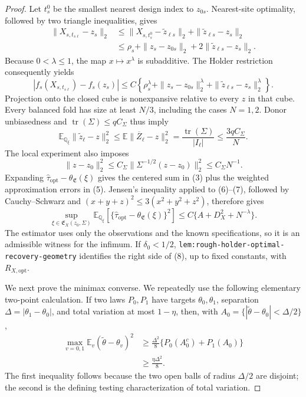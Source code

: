 \documentclass{article}
\begin{document}
\begin{proof}
Let \(t_s^0\) be the smallest nearest design index to \(z_{0s}\).  Nearest-site optimality, followed by two triangle inequalities, gives
\[
\begin{aligned}
 \|X_{s,t_{s\ell}}-z_s\|_2
 &\le \|X_{s,t_s^0}-\widetilde z_{\ell s}\|_2
       +\|\widetilde z_{\ell s}-z_s\|_2\\
 &\le \rho_s+\|z_s-z_{0s}\|_2
       +2\|\widetilde z_{\ell s}-z_s\|_2.
\end{aligned}                                               \tag{4}
\]
Because \(0<\lambda\le1\), the map \(x\mapsto x^\lambda\) is subadditive.  The Holder restriction consequently yields
\[
 |f_s(X_{s,t_{s\ell}})-f_s(z_s)|
 \le C\left\{\rho_s^\lambda+
 \|z_s-z_{0s}\|_2^\lambda+
 \|\widetilde z_{\ell s}-z_s\|_2^\lambda\right\}.        \tag{5}
\]
Projection onto the closed cube is nonexpansive relative to every \(z\) in that cube.  Every balanced fold has size at least \(N/3\), including the cases \(N=1,2\).  Donor unbiasedness and \(\operatorname{tr}(\Sigma)\le qC_\Sigma\) thus imply
\[
 \mathbb E_{\mathbb Q_\xi}\|\widetilde z_\ell-z\|_2^2
 \le\mathbb E\|\overline Z_\ell-z\|_2^2
 =\frac{\operatorname{tr}(\Sigma)}{|I_\ell|}
 \le\frac{3qC_\Sigma}{N}.                                  \tag{6}
\]
The local experiment also imposes
\[
 \|z-z_0\|_2^2
 \le C_\Sigma\|\Sigma^{-1/2}(z-z_0)\|_2^2
 \le C_\Sigma N^{-1}.                                      \tag{7}
\]
Expanding \(\widehat\tau_{\mathrm{opt}}-\theta_{\mathfrak E}(\xi)\) gives the centered sum in (3) plus the weighted approximation errors in (5).  Jensen's inequality applied to (6)--(7), followed by Cauchy--Schwarz and \((x+y+z)^2\le3(x^2+y^2+z^2)\), therefore gives
\[
 \sup_{\xi\in\mathfrak E_X(z_0,\Sigma)}
 \mathbb E_{\mathbb Q_\xi}
 \left[\{\widehat\tau_{\mathrm{opt}}-
 \theta_{\mathfrak E}(\xi)\}^2\right]
 \le C\{A+D_X^2+N^{-\lambda}\}.                           \tag{8}
\]
The estimator uses only the observations and the known specifications, so it is an admissible witness for the infimum.  If \(\delta_0<1/2\), \texttt{lem:rough-holder-optimal-recovery-geometry} identifies the right side of (8), up to fixed constants, with \(R_{X,\mathrm{opt}}\).

We next prove the minimax converse.  We repeatedly use the following elementary two-point calculation.  If two laws \(P_0,P_1\) have targets \(\theta_0,\theta_1\), separation \(\Delta=|\theta_1-\theta_0|\), and total variation at most \(1-\eta\), then, with \(A_0=\{|\widetilde\theta-\theta_0|<\Delta/2\}\),
\[
\begin{aligned}
 \max_{v=0,1}\mathbb E_v(\widetilde\theta-\theta_v)^2
 &\ge\frac{\Delta^2}{8}\{P_0(A_0^c)+P_1(A_0)\}\\
 &\ge\frac{\eta\Delta^2}{8}.
\end{aligned}                                               \tag{9}
\]
The first inequality follows because the two open balls of radius \(\Delta/2\) are disjoint; the second is the defining testing characterization of total variation.


\end{proof}
\end{document}
